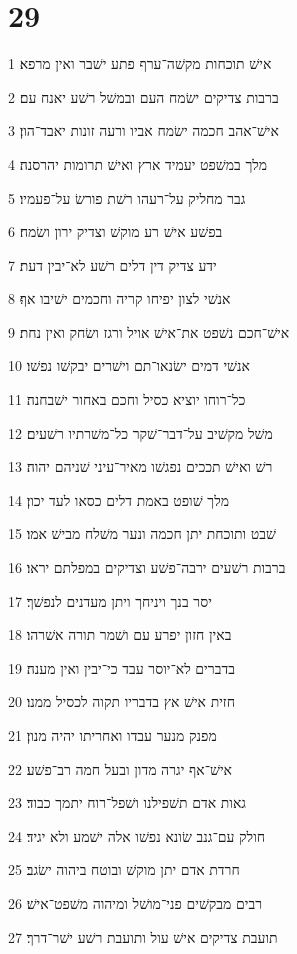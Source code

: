 \chapter{29}

\par 1 אישׁ תוכחות מקשׁה־ערף פתע ישׁבר ואין מרפא׃
\par 2 ברבות צדיקים ישׂמח העם ובמשׁל רשׁע יאנח עם׃
\par 3 אישׁ־אהב חכמה ישׂמח אביו ורעה זונות יאבד־הון׃
\par 4 מלך במשׁפט יעמיד ארץ ואישׁ תרומות יהרסנה׃
\par 5 גבר מחליק על־רעהו רשׁת פורשׂ על־פעמיו׃
\par 6 בפשׁע אישׁ רע מוקשׁ וצדיק ירון ושׂמח׃
\par 7 ידע צדיק דין דלים רשׁע לא־יבין דעת׃
\par 8 אנשׁי לצון יפיחו קריה וחכמים ישׁיבו אף׃
\par 9 אישׁ־חכם נשׁפט את־אישׁ אויל ורגז ושׂחק ואין נחת׃
\par 10 אנשׁי דמים ישׂנאו־תם וישׁרים יבקשׁו נפשׁו׃
\par 11 כל־רוחו יוציא כסיל וחכם באחור ישׁבחנה׃
\par 12 משׁל מקשׁיב על־דבר־שׁקר כל־משׁרתיו רשׁעים׃
\par 13 רשׁ ואישׁ תככים נפגשׁו מאיר־עיני שׁניהם יהוה׃
\par 14 מלך שׁופט באמת דלים כסאו לעד יכון׃
\par 15 שׁבט ותוכחת יתן חכמה ונער משׁלח מבישׁ אמו׃
\par 16 ברבות רשׁעים ירבה־פשׁע וצדיקים במפלתם יראו׃
\par 17 יסר בנך ויניחך ויתן מעדנים לנפשׁך׃
\par 18 באין חזון יפרע עם ושׁמר תורה אשׁרהו׃
\par 19 בדברים לא־יוסר עבד כי־יבין ואין מענה׃
\par 20 חזית אישׁ אץ בדבריו תקוה לכסיל ממנו׃
\par 21 מפנק מנער עבדו ואחריתו יהיה מנון׃
\par 22 אישׁ־אף יגרה מדון ובעל חמה רב־פשׁע׃
\par 23 גאות אדם תשׁפילנו ושׁפל־רוח יתמך כבוד׃
\par 24 חולק עם־גנב שׂונא נפשׁו אלה ישׁמע ולא יגיד׃
\par 25 חרדת אדם יתן מוקשׁ ובוטח ביהוה ישׂגב׃
\par 26 רבים מבקשׁים פני־מושׁל ומיהוה משׁפט־אישׁ׃
\par 27 תועבת צדיקים אישׁ עול ותועבת רשׁע ישׁר־דרך׃


